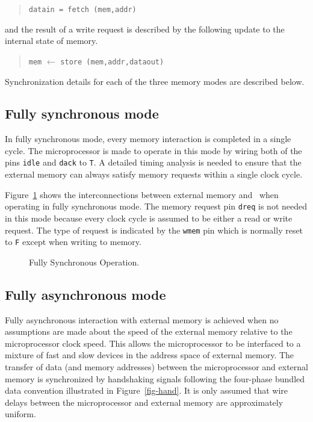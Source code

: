 \begin{quote}
\verb"datain = fetch (mem,addr)"
\end{quote}

\noindent
and the result of a write request
is described by the following update to the internal
state of memory.

\begin{quote}
\verb"mem" $\leftarrow$ \verb"store (mem,addr,dataout)"
\end{quote}

Synchronization details for each of the three memory modes
are described below.

\subsection{Fully synchronous mode}

In fully synchronous mode,
every memory interaction is completed in a single cycle.
The microprocessor is made to operate in this mode by
wiring both of the pins \verb"idle" and \verb"dack" to \verb"T".
A detailed timing analysis is needed to ensure that the
external memory can always satisfy memory requests within
a single clock cycle.

Figure~\ref{fig-syn} shows the interconnections between
external memory and \Tamarack\
when operating in fully synchronous mode.
The memory request pin \verb"dreq" is not needed in this mode
because every clock cycle is assumed to be either a read or write request.
The type of request is indicated by the \verb"wmem" pin which is
normally reset to \verb"F" except when writing to memory.

\begin{figure}
\begin{center}


\caption{Fully Synchronous Operation.}
\label{fig-syn}
\end{center}
\end{figure}

\subsection{Fully asynchronous mode}

Fully asynchronous interaction with external memory is achieved
when no assumptions are made about
the speed of the external memory relative to the
microprocessor clock speed.
This allows the microprocessor to be interfaced to a mixture
of fast and slow devices in the address space of external memory.
The transfer of data (and memory addresses) between the microprocessor
and external memory is synchronized by handshaking signals
following the four-phase bundled data convention
illustrated in Figure~\ref{fig-hand}.
It is only assumed that wire delays between the microprocessor
and external memory are approximately uniform.

